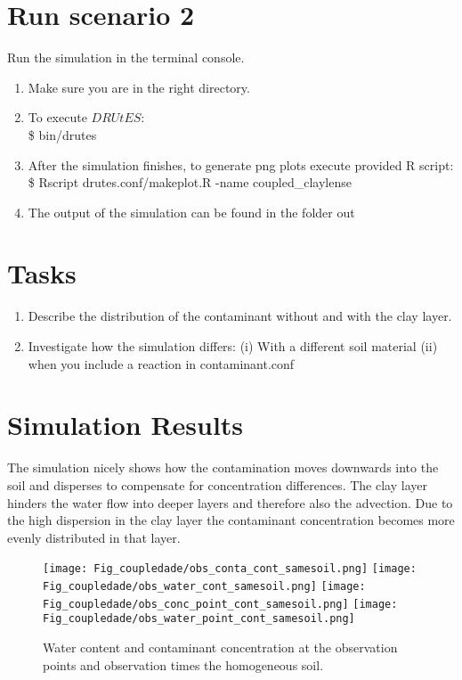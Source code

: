 \section*{Run scenario 2}
Run the simulation in the terminal console.
\begin{enumerate}
	\item Make sure you are in the right directory. 
	\item To execute $DRUtES$: \\
	\$ bin/drutes
	\item After the simulation finishes, to generate png plots execute provided R script: \\
	\$ Rscript drutes.conf/makeplot.R -name coupled\_claylense \\
	\item The output of the simulation can be found in the folder out
\end{enumerate}


\section*{Tasks}

\begin{enumerate}
\item Describe the distribution of the contaminant without and with the clay layer.
\item Investigate how the simulation differs: (i) With a different soil material (ii) when you include a reaction in contaminant.conf
\end{enumerate}

\newpage

\section*{Simulation Results}

The simulation nicely shows how the contamination moves downwards into the soil and disperses to compensate for concentration differences. The clay layer hinders the water flow into deeper layers and therefore also the advection. Due to the high dispersion in the clay layer the contaminant concentration becomes more evenly distributed in that layer. 


\begin{figure}[!h]
	\centering
	\texttt{[image: Fig\_coupledade/obs\_conta\_cont\_samesoil.png]}
	\texttt{[image: Fig\_coupledade/obs\_water\_cont\_samesoil.png]}
	\texttt{[image: Fig\_coupledade/obs\_conc\_point\_cont\_samesoil.png]}
	\texttt{[image: Fig\_coupledade/obs\_water\_point\_cont\_samesoil.png]}
	\caption{Water content  and contaminant concentration at the observation points and observation times the homogeneous soil.}
\end{figure}

